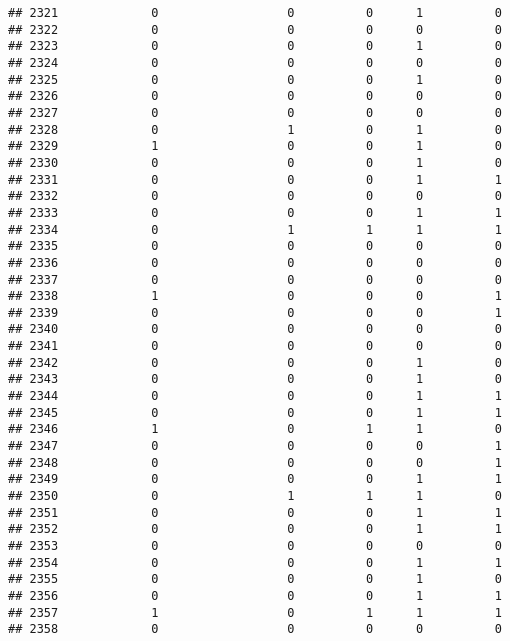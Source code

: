 \documentclass[
]{article}
\begin{document}
\begin{verbatim}
## 2321             0                  0          0      1          0
## 2322             0                  0          0      0          0
## 2323             0                  0          0      1          0
## 2324             0                  0          0      0          0
## 2325             0                  0          0      1          0
## 2326             0                  0          0      0          0
## 2327             0                  0          0      0          0
## 2328             0                  1          0      1          0
## 2329             1                  0          0      1          0
## 2330             0                  0          0      1          0
## 2331             0                  0          0      1          1
## 2332             0                  0          0      0          0
## 2333             0                  0          0      1          1
## 2334             0                  1          1      1          1
## 2335             0                  0          0      0          0
## 2336             0                  0          0      0          0
## 2337             0                  0          0      0          0
## 2338             1                  0          0      0          1
## 2339             0                  0          0      0          1
## 2340             0                  0          0      0          0
## 2341             0                  0          0      0          0
## 2342             0                  0          0      1          0
## 2343             0                  0          0      1          0
## 2344             0                  0          0      1          1
## 2345             0                  0          0      1          1
## 2346             1                  0          1      1          0
## 2347             0                  0          0      0          1
## 2348             0                  0          0      0          1
## 2349             0                  0          0      1          1
## 2350             0                  1          1      1          0
## 2351             0                  0          0      1          1
## 2352             0                  0          0      1          1
## 2353             0                  0          0      0          0
## 2354             0                  0          0      1          1
## 2355             0                  0          0      1          0
## 2356             0                  0          0      1          1
## 2357             1                  0          1      1          1
## 2358             0                  0          0      0          0

\end{verbatim}
\end{document}
